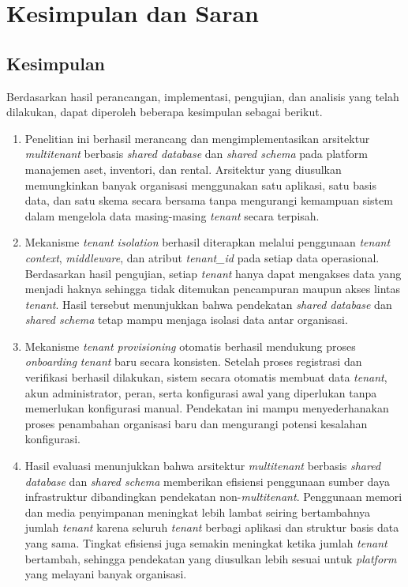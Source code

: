 \chapter{Kesimpulan dan Saran}

\section{Kesimpulan}

Berdasarkan hasil perancangan, implementasi, pengujian, dan analisis yang telah dilakukan, dapat diperoleh beberapa kesimpulan sebagai berikut.

\begin{enumerate}
  \item Penelitian ini berhasil merancang dan mengimplementasikan arsitektur \textit{multitenant} berbasis \textit{shared database} dan \textit{shared schema} pada platform manajemen aset, inventori, dan rental. Arsitektur yang diusulkan memungkinkan banyak organisasi menggunakan satu aplikasi, satu basis data, dan satu skema secara bersama tanpa mengurangi kemampuan sistem dalam mengelola data masing-masing \textit{tenant} secara terpisah.

  \item Mekanisme \textit{tenant isolation} berhasil diterapkan melalui penggunaan \textit{tenant context}, \textit{middleware}, dan atribut \textit{tenant\_id} pada setiap data operasional. Berdasarkan hasil pengujian, setiap \textit{tenant} hanya dapat mengakses data yang menjadi haknya sehingga tidak ditemukan pencampuran maupun akses lintas \textit{tenant}. Hasil tersebut menunjukkan bahwa pendekatan \textit{shared database} dan \textit{shared schema} tetap mampu menjaga isolasi data antar organisasi.

  \item Mekanisme \textit{tenant provisioning} otomatis berhasil mendukung proses \textit{onboarding} \textit{tenant} baru secara konsisten. Setelah proses registrasi dan verifikasi berhasil dilakukan, sistem secara otomatis membuat data \textit{tenant}, akun administrator, peran, serta konfigurasi awal yang diperlukan tanpa memerlukan konfigurasi manual. Pendekatan ini mampu menyederhanakan proses penambahan organisasi baru dan mengurangi potensi kesalahan konfigurasi.

  \item Hasil evaluasi menunjukkan bahwa arsitektur \textit{multitenant} berbasis \textit{shared database} dan \textit{shared schema} memberikan efisiensi penggunaan sumber daya infrastruktur dibandingkan pendekatan non-\textit{multitenant}. Penggunaan memori dan media penyimpanan meningkat lebih lambat seiring bertambahnya jumlah \textit{tenant} karena seluruh \textit{tenant} berbagi aplikasi dan struktur basis data yang sama. Tingkat efisiensi juga semakin meningkat ketika jumlah \textit{tenant} bertambah, sehingga pendekatan yang diusulkan lebih sesuai untuk \textit{platform} yang melayani banyak organisasi.


\end{enumerate}
